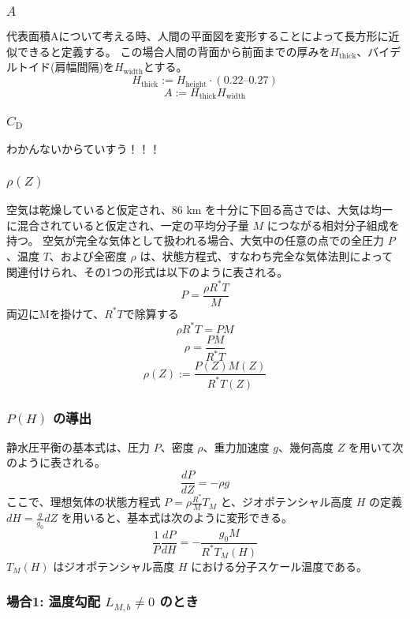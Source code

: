 \documentclass[a4paper,12pt]{article}
\begin{document}
\subsubsection{$A$}
代表面積Aについて考える時、人間の平面図を変形することによって長方形に近似できると定義する。
この場合人間の背面から前面までの厚みを$H_{\mathrm{thick}}$、バイデルトイド(肩幅間隔)を$H_{\mathrm{width}}$とする。
\[
H_{\mathrm{thick}} := H_{\mathrm{height}} \cdot (0.22 \text{--} 0.27)
\]
\[
A := H_{\mathrm{thick}} H_{\mathrm{width}}
\]

\subsubsection{$C_{\mathrm{D}}$}
わかんないからていすう！！！ %


\subsubsection{$\rho(Z)$}
空気は乾燥していると仮定され、86 km を十分に下回る高さでは、大気は均一に混合されていると仮定され、一定の平均分子量 $M$ につながる相対分子組成を持つ。
空気が完全な気体として扱われる場合、大気中の任意の点での全圧力 $P$、温度 $T$、および全密度 $\rho$ は、状態方程式、すなわち完全な気体法則によって関連付けられ、その1つの形式は以下のように表される。
\[
P = \frac{\rho R^* T}{M}
\]
両辺にMを掛けて、$R^*T$で除算する
\[
\rho R^* T = PM
\]
\[
  \rho = \frac{P M}{R^* T}
\]
\[
  \rho(Z) := \frac{P(Z) M(Z)}{R^* T(Z)}
\]

\subsubsection*{$P(H)$ の導出}

静水圧平衡の基本式は、圧力 $P$、密度 $\rho$、重力加速度 $g$、幾何高度 $Z$ を用いて次のように表される。
\[
\frac{dP}{dZ} = - \rho g
\]
ここで、理想気体の状態方程式 $P = \rho \frac{R^*}{M} T_M$ と、ジオポテンシャル高度 $H$ の定義 $dH = \frac{g}{g_0} dZ$ を用いると、基本式は次のように変形できる。
\[
\frac{1}{P}\frac{dP}{dH} = -\frac{g_0 M}{R^*T_M(H)}
\]
$T_M(H)$ はジオポテンシャル高度 $H$ における分子スケール温度である。

\subsubsection*{場合1: 温度勾配 $L_{M,b} \neq 0$ のとき}
\end{document}
